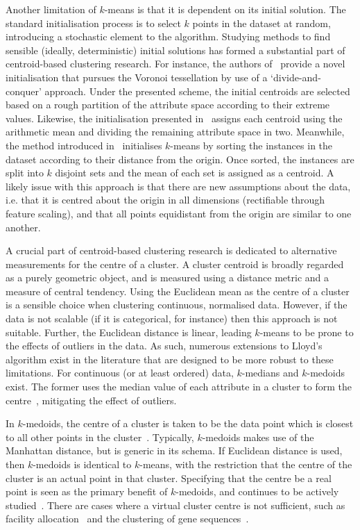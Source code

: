 Another limitation of \(k\)-means is that it is dependent on its initial
solution. The standard initialisation process is to select \(k\) points in the
dataset at random, introducing a stochastic element to the algorithm. Studying
methods to find sensible (ideally, deterministic) initial solutions has formed a
substantial part of centroid-based clustering research. For instance, the
authors of~\cite{Manoharan2016} provide a novel initialisation that pursues the
Voronoi tessellation by use of a `divide-and-conquer' approach. Under the
presented scheme, the initial centroids are selected based on a rough partition
of the attribute space according to their extreme values. Likewise, the
initialisation presented in~\cite{Singh2013} assigns each centroid using the
arithmetic mean and dividing the remaining attribute space in two. Meanwhile,
the method introduced in~\cite{Katara2015} initialises \(k\)-means by sorting
the instances in the dataset according to their distance from the origin. Once
sorted, the instances are split into \(k\) disjoint sets and the mean of each
set is assigned as a centroid. A likely issue with this approach is that there
are new assumptions about the data, i.e. that it is centred about the origin in
all dimensions (rectifiable through feature scaling), and that all points
equidistant from the origin are similar to one another.

A crucial part of centroid-based clustering research is dedicated to alternative
measurements for the centre of a cluster. A cluster centroid is broadly regarded
as a purely geometric object, and is measured using a distance metric and a
measure of central tendency. Using the Euclidean mean as the centre of a cluster
is a sensible choice when clustering continuous, normalised data. However, if
the data is not scalable (if it is categorical, for instance) then this approach
is not suitable. Further, the Euclidean distance is linear, leading \(k\)-means
to be prone to the effects of outliers in the data. As such, numerous
extensions to Lloyd's algorithm exist in the literature that are designed to be
more robust to these limitations. For continuous (or at least ordered) data,
\(k\)-medians and \(k\)-medoids exist. The former uses the median value of each
attribute in a cluster to form the centre~\cite{Arya2001,Bradley1997},
mitigating the effect of outliers.

In \(k\)-medoids, the centre of a cluster is taken to be the data point which is
closest to all other points in the cluster~\cite{Kaufman1987}.  Typically,
\(k\)-medoids makes use of the Manhattan distance, but is generic in its schema.
If Euclidean distance is used, then \(k\)-medoids is identical to \(k\)-means,
with the restriction that the centre of the cluster is an actual point in that
cluster. Specifying that the centre be a real point is seen as the primary
benefit of \(k\)-medoids, and continues to be actively
studied~\cite{Schubert2019,Ushakov2021}. There are cases where a virtual cluster
centre is not sufficient, such as facility
allocation~\cite{Chen2016clustering,Wang2020} and the clustering of gene
sequences~\cite{Johnson2018}.

